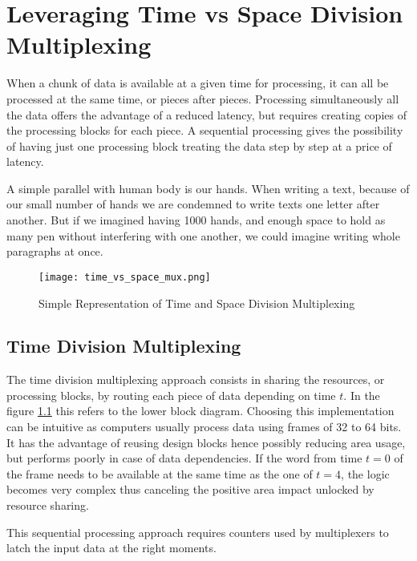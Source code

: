 \chapter{Leveraging Time vs Space Division Multiplexing}\label{sec:leveraging-time-division-multiplexing}

When a chunk of data is available at a given time for processing, it can all be processed at the same time, or pieces after pieces.
Processing simultaneously all the data offers the advantage of a reduced latency, but requires creating copies of the processing 
blocks for each piece. A sequential processing gives the possibility of having just one processing block treating the data step 
by step at a price of latency.

A simple parallel with human body is our hands. When writing a text, because of our small number of hands we are condemned to write 
texts one letter after another. But if we imagined having 1000 hands, and enough space to hold as many pen without interfering with one another,
we could imagine writing whole paragraphs at once.

\begin{figure}
    \centering
    \texttt{[image: time\_vs\_space\_mux.png]}
    \caption{Simple Representation of Time and Space Division Multiplexing}
    \label{fig:time-vs-space}
\end{figure}

\section{Time Division Multiplexing}\label{sec:time-division-multiplexing}
The time division multiplexing approach consists in sharing the resources, or processing blocks, by routing each piece of data 
depending on time \(t\). In the figure \ref{fig:time-vs-space} this refers to the lower block diagram. Choosing this implementation 
can be intuitive as computers usually process data using frames of 32 to 64 bits. It has the advantage of reusing design blocks hence
possibly reducing area usage, but performs poorly in case of data dependencies. If the word from time \(t=0\) of the frame needs to be 
available at the same time as the one of \(t=4\), the logic becomes very complex thus canceling the positive area impact unlocked by 
resource sharing.

This sequential processing approach requires counters used by multiplexers to latch the input data at the right moments.

